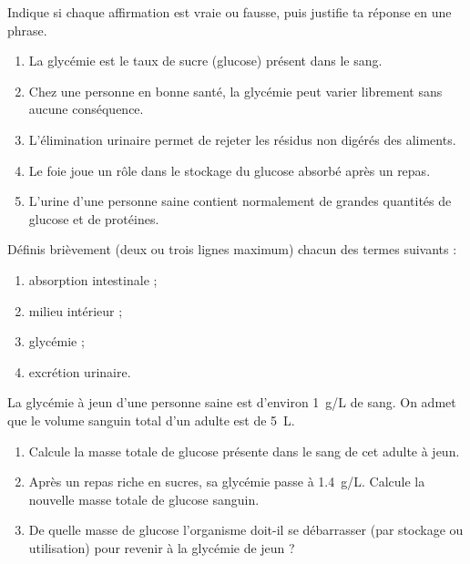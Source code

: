\documentclass[11pt]{article}
\newcounter{popsec}
\newcounter{popsub}
\newcommand{\courssub}[1]{%
  \stepcounter{popsub}%
  \par\vspace{9pt}\noindent{\popxbold\fontsize{11.5}{13}\selectfont\color{popink}{\color{poporange}\thepopsec.\thepopsub}\hspace{6pt}#1}\par\nopagebreak\vspace{4pt}
}
\begin{document}
\begin{exercice}
Indique si chaque affirmation est vraie ou fausse, puis justifie ta réponse en une phrase.
\begin{enumerate}
\item La glycémie est le taux de sucre (glucose) présent dans le sang.
\item Chez une personne en bonne santé, la glycémie peut varier librement sans aucune conséquence.
\item L'élimination urinaire permet de rejeter les résidus non digérés des aliments.
\item Le foie joue un rôle dans le stockage du glucose absorbé après un repas.
\item L'urine d'une personne saine contient normalement de grandes quantités de glucose et de protéines.
\end{enumerate}
\end{exercice}

\begin{exercice}
Définis brièvement (deux ou trois lignes maximum) chacun des termes suivants :
\begin{enumerate}
\item absorption intestinale ;
\item milieu intérieur ;
\item glycémie ;
\item excrétion urinaire.
\end{enumerate}
\end{exercice}

\begin{exercice}
La glycémie à jeun d'une personne saine est d'environ \SI{1}{g/L} de sang. On admet que le volume sanguin total d'un adulte est de \SI{5}{L}.
\begin{enumerate}
\item Calcule la masse totale de glucose présente dans le sang de cet adulte à jeun.
\item Après un repas riche en sucres, sa glycémie passe à \SI{1,4}{g/L}. Calcule la nouvelle masse totale de glucose sanguin.
\item De quelle masse de glucose l'organisme doit-il se débarrasser (par stockage ou utilisation) pour revenir à la glycémie de jeun ?
\end{enumerate}
\end{exercice}

\courssub{Je m'entraîne}
\end{document}
